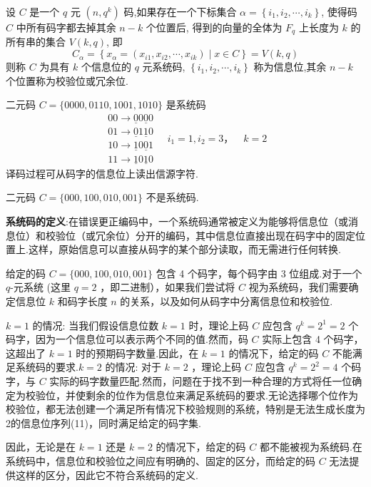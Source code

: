 \begin{definition}[ 系统码]
 设 $ C $ 是一个 $ q $ 元 $ \left(n, q^{k}\right) $ 码,如果存在一个下标集合 $ \alpha=\left\{i_{1}, i_{2}, \cdots, i_{k}\right\} $, 使得码 $ C $ 中所有码字都去掉其余 $ n-k $ 个位置后, 得到的向量的全体为 $ F_{q} $ 上长度为 $ k $ 的所有串的集合 $ V(k, q) $, 即
$$
C_{\alpha}=\left\{x_{\alpha}=\left(x_{i 1}, x_{i 2}, \cdots, x_{i k}\right) \mid x \in C\right\}=V(k, q)
$$
则称 $ C $ 为具有 $ k $ 个信息位的 $ q $ 元系统码, $ \left\{i_{1}, i_{2}, \cdots, i_{k}\right\} $ 称为信息位,其余 $ n-k $ 个位置称为校验位或冗余位.
\end{definition}

\begin{example}
二元码 $ C=\{0000,0110,1001,1010\} $ 是系统码
$$
\begin{array}{l}
00 \longrightarrow \underline{0} 0\underline{0} 0 \\
01 \longrightarrow \underline{0} 1 \underline{1}0  \\
10 \longrightarrow \underline{1}0\underline{0} 1 \\
11 \longrightarrow \underline{1}0\underline{1}0
\end{array}\quad i_{1}=1, i_{2}=3 ，\quad k=2
$$
译码过程可从码字的信息位上读出信源字符.
\end{example}

\begin{example}
   二元码 $ C=\{000,100,010,001\} $ 不是系统码.

\textbf{系统码的定义}:在错误更正编码中，一个系统码通常被定义为能够将信息位（或消息位）和校验位（或冗余位）分开的编码，其中信息位直接出现在码字中的固定位置上.这样，原始信息可以直接从码字的某个部分读取，而无需进行任何转换.
\begin{solution}
    给定的码 $ C=\{000,100,010,001\} $ 包含 4 个码字，每个码字由 3 位组成.对于一个 $ q $-元系统 (这里 $ q=2 $ ，即二进制），如果我们尝试将 $ C $ 视为系统码，我们需要确定信息位 $ k $ 和码字长度 $ n $ 的关系，以及如何从码字中分离信息位和校验位.

$ k=1 $ 的情况: 当我们假设信息位数 $ k=1 $ 时，理论上码 $ C $ 应包含 $ q^{k}=2^{1}=2 $ 个码字，因为一个信息位可以表示两个不同的值.然而，码 $ C $ 实际上包含 4 个码字，这超出了 $ k=1 $ 时的预期码字数量.因此，在 $ k=1 $ 的情况下，给定的码 $ C $ 不能满足系统码的要求.$ k=2 $ 的情况:
对于 $ k=2 $ ，理论上码 $ C $ 应包含 $ q^{k}=2^{2}=4 $ 个码字，与 $ C $ 实际的码字数量匹配.然而，问题在于找不到一种合理的方式将任一位确定为校验位，并使剩余的位作为信息位来满足系统码的要求.无论选择哪个位作为校验位，都无法创建一个满足所有情况下校验规则的系统，特别是无法生成长度为2的信息位序列(11)，同时满足给定的码字集.

因此，无论是在 $ k=1 $ 还是 $ k=2 $ 的情况下，给定的码 $ C $ 都不能被视为系统码.在系统码中，信息位和校验位之间应有明确的、固定的区分，而给定的码 $ C $ 无法提供这样的区分，因此它不符合系统码的定义.
\end{solution}




\end{example}


